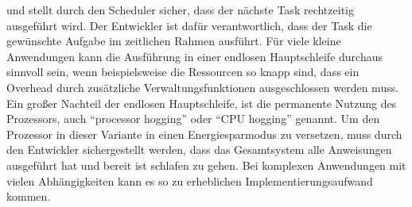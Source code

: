 und stellt durch den Scheduler sicher, dass der näch\-ste Task rechtzeitig ausgeführt wird. Der Entwickler ist dafür verantwortlich, dass der Task die ge\-wün\-schte Aufgabe im zeitlichen Rahmen ausführt. 
Für viele kleine Anwendungen kann die Ausführung in einer endlosen Hauptschleife durchaus sinnvoll sein, wenn beispielsweise die Ressourcen so knapp sind, dass ein Overhead durch zusätzliche Verwaltungsfunktionen ausgeschlossen werden muss. Ein großer Nachteil der endlosen Hauptschleife, ist die permanente Nutzung des Prozessors, auch "`processor hogging"' oder "`CPU hogging"' genannt. Um den Prozessor in dieser Variante in einen Energiesparmodus zu versetzen, muss durch den Entwickler sichergestellt werden, dass das Gesamtsystem alle Anweisungen ausgeführt hat und bereit ist schlafen zu gehen. Bei komplexen Anwendungen mit vielen Ab\-häng\-ig\-kei\-ten kann es so zu erheblichen Implementierungsaufwand kommen.
